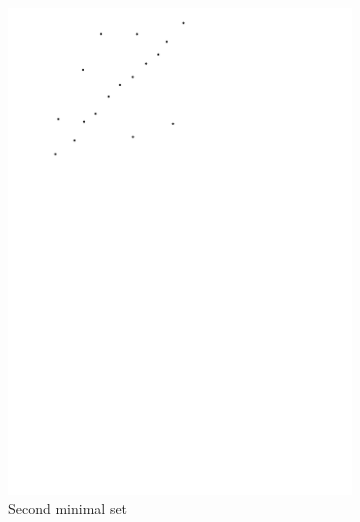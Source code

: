 \begin{figure}[htb]
\begin{subfigure}[b]{0.24\linewidth}
		\includegraphics[width=\textwidth,page=3]{figs/ransac.pdf}
		\caption{Second minimal set}
		\label{fig:ransac:c}
	\end{subfigure}
	\begin{subfigure}[b]{0.24\linewidth}
		\centering

\end{subfigure}
\end{figure}
